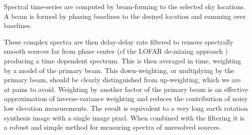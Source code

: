 \documentclass[preprint]{aastex}
\begin{document}
Spectral time-series are computed by beam-forming to the selected sky
locations. A beam is formed by phasing baselines to the desired location and
summing over baselines.  




 These complex spectra are then delay-delay rate filtered to remove spectrally
smooth sources far from phase center \citep{Parsons:2009p7859} (cf the LOFAR
de-mixing approach \cite{Offringa:2012p9691})  producing a time dependent
spectrum. This is then averaged in time,  weighting by a model of the primary
beam. This down-weighting, or multiplying by the primary beam, should be
clearly distinguished from up-weighting, which we are at pains to avoid.
Weighting by another factor of the primary beam is an effective approximation
of inverse-variance weighting \citep{Pober:2012p8800} and reduces the
contribution of noisy low elevation measurements.  The result is equivalent to
a very long earth rotation synthesis image with a single image pixel. When
combined with the filtering it is a robust and simple method for measuring
spectra of unresolved sources. 

\end{document}
